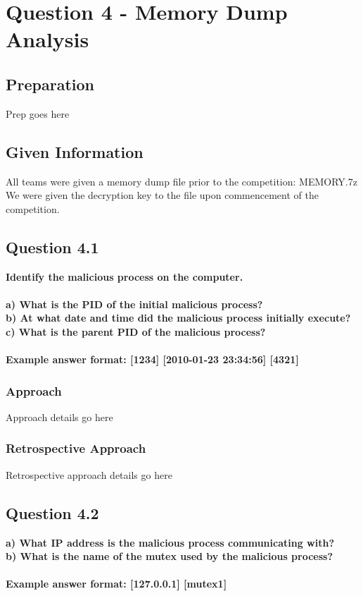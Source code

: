 \chapter{Question 4 - Memory Dump Analysis}

\section{Preparation}
Prep goes here

\section{Given Information}
All teams were given a memory dump file prior to the competition: MEMORY.7z\\
We were given the decryption key to the file upon commencement of the
competition.

\section{Question 4.1}
\textbf{Identify the malicious process on the computer.
\\\\
a) What is the PID of the initial malicious process?
\\b) At what date and time did the malicious process initially execute?
\\c) What is the parent PID of the malicious process?
\\\\
Example answer format: [1234] [2010-01-23 23:34:56] [4321]}
\subsection{Approach}
Approach details go here
\subsection{Retrospective Approach}
Retrospective approach details go here

\section{Question 4.2}
\textbf{a) What IP address is the malicious process communicating with?
\\b) What is the name of the mutex used by the malicious process?
\\\\
Example answer format: [127.0.0.1] [mutex1]}
